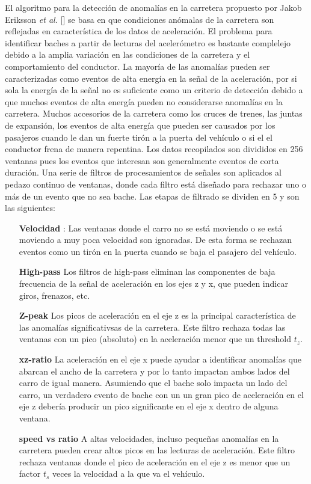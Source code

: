 El algoritmo para la detección de anomalías en la carretera propuesto por Jakob Eriksson {\it et al.} [] se basa en que condiciones anómalas de la carretera
son reflejadas en característica de los datos de aceleración. El problema para identificar baches a partir de lecturas del acelerómetro es bastante 
complelejo debido a la amplia variación en las condiciones de la carretera y el comportamiento del conductor. La mayoría de las anomalías pueden ser 
caracterizadas como eventos de alta energía en la señal de la aceleración, por si sola la energía de la señal no es suficiente como un criterio de 
detección debido a que muchos eventos de alta energía pueden no considerarse anomalías en la carretera. Muchos accesorios de la carretera como 
los cruces de trenes, las juntas de expansión, los eventos de alta energía que pueden ser causados por los pasajeros cuando le dan un fuerte 
tirón a la puerta del vehículo o si el el conductor frena de manera repentina. Los datos recopilados son divididos en 256 ventanas pues 
los eventos que interesan son generalmente eventos de corta duración. Una serie de filtros de procesamientos de señales son aplicados 
al  pedazo continuo de ventanas, donde cada filtro está diseñado para rechazar uno o más de un evento que no sea bache. 
Las etapas de filtrado se dividen en 5 y son las siguientes:

\begin{enumerate}
	\item [ \textbf {Velocidad} ]: Las ventanas donde el carro no se está moviendo o se está moviendo a muy poca velocidad son ignoradas. 
		De esta forma se rechazan eventos como un tirón en la puerta cuando se baja el pasajero del vehículo.\\
	\item [ \textbf {High-pass} ] Los filtros de high-pass eliminan las componentes de baja frecuencia de la señal de aceleración en los ejes z y x, 
		que pueden indicar giros, frenazos, etc.\\
	\item  [ \textbf {Z-peak} ] Los picos de aceleración en el eje z es la principal característica de las anomalías significativsas de la carretera.
		Este filtro rechaza todas las ventanas con un pico (absoluto) en la aceleración menor que un threshold $t_z$.\\
	\item  [ \textbf {xz-ratio } ] La aceleración en el eje x puede ayudar a identificar anomalías que abarcan el ancho de la carretera y por lo tanto 
		impactan ambos lados del carro de igual manera.  Asumiendo que el bache solo impacta un lado del carro, un verdadero evento de bache con un
		un gran pico de aceleración en el eje z debería producir un pico significante en el eje x dentro de alguna ventana.\\
	\item  [ \textbf {speed vs ratio } ] A altas velocidades, incluso pequeñas anomalías en la carretera pueden crear altos picos en las lecturas 
		de aceleración. Este filtro rechaza ventanas donde el pico de aceleración en el eje z es menor que un factor $t_s$ veces la velocidad a la que 
		va el vehículo.\\
\end{enumerate}

